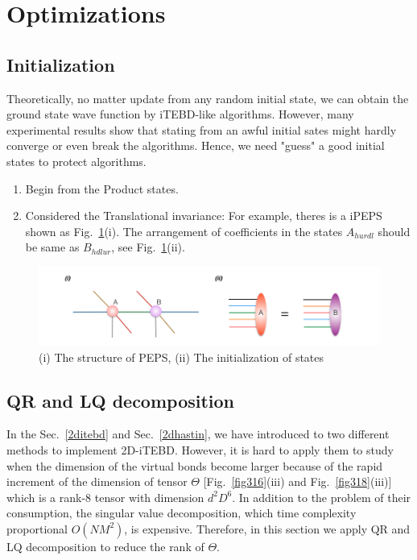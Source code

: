 \section{Optimizations}
\label{2dopt}

\subsection{Initialization}
\label{2doptInit}

Theoretically, no matter update from any random initial state, we can obtain the ground state wave function by iTEBD-like algorithms. However, many experimental results show that stating from an awful initial sates might hardly converge or even break the algorithms. Hence, we need "guess" a good initial states to protect algorithms.

\begin{enumerate}
	\item Begin from the Product states.
	\item Considered the Translational invariance: For example, theres is a iPEPS shown as Fig.~\ref{fig321}(i). The arrangement of coefficients in the states $A_{hurdl}$ should be same as $B_{hdlur}$, see Fig.~\ref{fig321}(ii).
\end{enumerate}

\begin{figure}[ht]
	\centering
	\includegraphics[width=1.00\textwidth]{figures/fig321.png}
	\caption[The diagrams of initializing projected entangled pair states]{(i) The structure of PEPS, (ii) The initialization of states}
	\label{fig321}
\end{figure}

\subsection{QR and LQ decomposition}
\label{2doptQR} 
In the Sec.~\ref{2ditebd} and Sec.~\ref{2dhastin}, we have introduced to two different methods to implement 2D-iTEBD. However, it is hard to apply them to study when the dimension of the virtual bonds become larger because of the rapid increment of the dimension of tensor $\Theta$ [Fig.~\ref{fig316}(iii) and Fig.~\ref{fig318}(iii)] which is a rank-8 tensor with dimension $d^2D^6$. In addition to the problem of their consumption, the singular value decomposition, which time complexity proportional $O(NM^2)$, is expensive. Therefore, in this section we apply QR and LQ decomposition to reduce the rank of $\Theta$.

